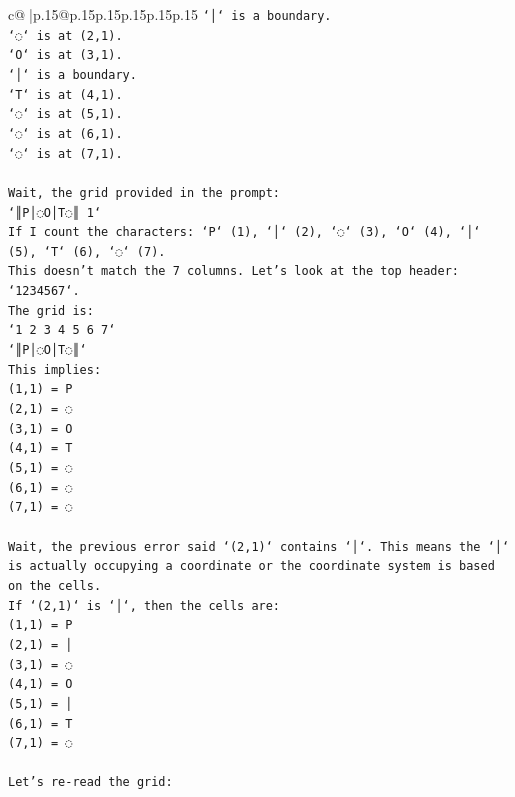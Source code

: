 \documentclass{article}
\begin{document}
{\begin{supertabular}{c@{$\;$}|p{.15\linewidth}@{}p{.15\linewidth}p{.15\linewidth}p{.15\linewidth}p{.15\linewidth}p{.15\linewidth}}
{{{\texttt{`│` is a boundary.} \\
\texttt{`◌` is at (2,1).} \\
\texttt{`O` is at (3,1).} \\
\texttt{`│` is a boundary.} \\
\texttt{`T` is at (4,1).} \\
\texttt{`◌` is at (5,1).} \\
\texttt{`◌` is at (6,1).} \\
\texttt{`◌` is at (7,1).} \\
\\ 
\texttt{Wait, the grid provided in the prompt:} \\
\texttt{`║P│◌O│T◌║ 1`} \\
\texttt{If I count the characters: `P` (1), `│` (2), `◌` (3), `O` (4), `│` (5), `T` (6), `◌` (7).} \\
\texttt{This doesn't match the 7 columns. Let's look at the top header: `1234567`.} \\
\texttt{The grid is:} \\
\texttt{`1 2 3 4 5 6 7`} \\
\texttt{`║P│◌O│T◌║`} \\
\texttt{This implies:} \\
\texttt{(1,1) = P} \\
\texttt{(2,1) = ◌} \\
\texttt{(3,1) = O} \\
\texttt{(4,1) = T} \\
\texttt{(5,1) = ◌} \\
\texttt{(6,1) = ◌} \\
\texttt{(7,1) = ◌} \\
\\ 
\texttt{Wait, the previous error said `(2,1)` contains `│`. This means the `│` is actually occupying a coordinate or the coordinate system is based on the cells.} \\
\texttt{If `(2,1)` is `│`, then the cells are:} \\
\texttt{(1,1) = P} \\
\texttt{(2,1) = │} \\
\texttt{(3,1) = ◌} \\
\texttt{(4,1) = O} \\
\texttt{(5,1) = │} \\
\texttt{(6,1) = T} \\
\texttt{(7,1) = ◌} \\
\\ 
\texttt{Let's re{-}read the grid:} \\
}}}
\end{supertabular}}
\end{document}

